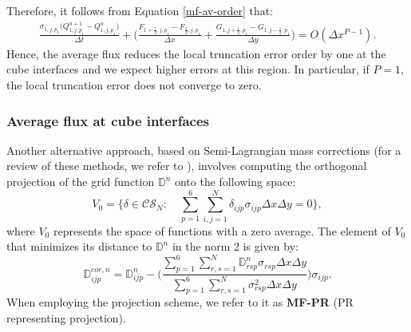 Therefore, it follows from Equation \eqref{mf-av-order} that:
\begin{align*}
	\frac{\sigma_{1,j,p_1} \big(Q_{1,j,p_1}^{n+1}- Q_{1,j,p_1}^n\big)}{\Delta t} +
	\bigg(
	\frac{F_{1+\frac{1}{2},j,p_1}-F_{\frac{1}{2},j,p_1}}{\Delta x}+
	\frac{G_{1,j+\frac{1}{2},p_1}-G_{1,j-\frac{1}{2},p_1}}{\Delta y} \bigg)
	= O(\Delta x^{P-1}).
\end{align*}
Hence, the average flux reduces the local truncation
error order by one at the cube interfaces and we expect higher errors at this region.
In particular, if $P=1$, the local truncation error does not converge to zero.
\subsubsection{Average flux at cube interfaces}
\label{mf-pr}
Another alternative approach, based on Semi-Lagrangian mass corrections
(for a review of these methods, we refer to \citet{diamantakis:2014}),
involves computing the orthogonal projection of the grid function $\mathbb{D}^n$ onto the following space:
\begin{equation*}
	V_0 = \{ \delta \in \mathcal{CS}_N: \quad
		\sum_{p=1}^6 \sum_{i,j=1}^N \mathbb{\delta}_{ijp} \sigma_{ijp} \Delta x \Delta y = 0\},
\end{equation*}
where $V_0$ represents the space of functions with a zero average.
The element of $V_0$ that minimizes its distance to $\mathbb{D}^n$ in the norm 2 is given by:
\begin{equation*}
\mathbb{D}^{cor,n}_{ijp} = \mathbb{D}^n_{ijp} - \bigg(\frac{	\sum_{p=1}^6 \sum_{r,s=1}^N \mathbb{D}_{rsp}^n \sigma_{rsp} \Delta x \Delta y}
 {\sum_{p=1}^6 \sum_{r,s=1}^N \sigma_{rsp}^2 \Delta x \Delta y}\bigg)\sigma_{ijp}.
\end{equation*}
When employing the projection scheme, we refer to it as \textbf{MF-PR} (PR representing projection).


